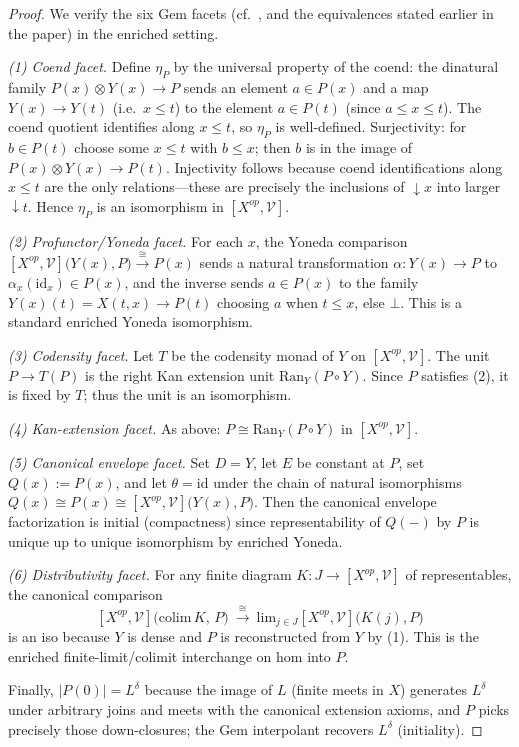 \documentclass[11pt]{article}
\theoremstyle{plain}
\theoremstyle{definition}
\theoremstyle{remark}
\newcommand{\V}{\mathcal{V}}
\renewcommand{\lim}{\mathrm{lim}}
\begin{document}
\begin{proof}
We verify the six Gem facets (cf.\ \cite{kelly1982basic}, and the equivalences stated earlier in the paper) in the enriched setting.

\emph{(1) Coend facet.}
Define $\eta_P$ by the universal property of the coend: the dinatural family $P(x)\otimes Y(x)\to P$ sends an element $a\in P(x)$ and a map $Y(x)\to Y(t)$ (i.e.\ $x\le t$) to the element $a\in P(t)$ (since $a\le x\le t$). The coend quotient identifies along $x\le t$, so $\eta_P$ is well-defined. Surjectivity: for $b\in P(t)$ choose some $x\le t$ with $b\le x$; then $b$ is in the image of $P(x)\otimes Y(x)\to P(t)$. Injectivity follows because coend identifications along $x\le t$ are the only relations—these are precisely the inclusions of $\downarrow x$ into larger $\downarrow t$. Hence $\eta_P$ is an isomorphism in $[X^{op},\V]$.

\emph{(2) Profunctor/Yoneda facet.}
For each $x$, the Yoneda comparison
\(
[X^{op},\V]\big(Y(x),P\big)\xrightarrow{\ \cong\ } P(x)
\)
sends a natural transformation $\alpha:Y(x)\to P$ to $\alpha_x(\mathrm{id}_x)\in P(x)$, and the inverse sends $a\in P(x)$ to the family $Y(x)(t)=X(t,x)\to P(t)$ choosing $a$ when $t\le x$, else $\bot$. This is a standard enriched Yoneda isomorphism.

\emph{(3) Codensity facet.}
Let $T$ be the codensity monad of $Y$ on $[X^{op},\V]$. The unit $P\to T(P)$ is the right Kan extension unit $\mathrm{Ran}_Y(P\circ Y)$. Since $P$ satisfies (2), it is fixed by $T$; thus the unit is an isomorphism.

\emph{(4) Kan-extension facet.}
As above: $P \cong \mathrm{Ran}_Y(P\circ Y)$ in $[X^{op},\V]$.

\emph{(5) Canonical envelope facet.}
Set $D=Y$, let $E$ be constant at $P$, set $Q(x):=P(x)$, and let $\theta=\mathrm{id}$ under the chain of natural isomorphisms $Q(x)\cong P(x)\cong [X^{op},\V]\big(Y(x),P\big)$. Then the canonical envelope factorization is initial (compactness) since representability of $Q(-)$ by $P$ is unique up to unique isomorphism by enriched Yoneda.

\emph{(6) Distributivity facet.}
For any finite diagram $K:J\to [X^{op},\V]$ of representables, the canonical comparison
$$
[X^{op},\V]\big(\mathrm{colim}\,K,\,P\big)\ \xrightarrow{\ \cong\ }\ \lim_{j\in J}[X^{op},\V]\big(K(j),P\big)
$$
is an iso because $Y$ is dense and $P$ is reconstructed from $Y$ by (1). This is the enriched finite-limit/colimit interchange on hom into $P$.

Finally, $|P(0)|=L^\delta$ because the image of $L$ (finite meets in $X$) generates $L^\delta$ under arbitrary joins and meets with the canonical extension axioms, and $P$ picks precisely those down-closures; the Gem interpolant recovers $L^\delta$ (initiality).
\end{proof}
\end{document}

